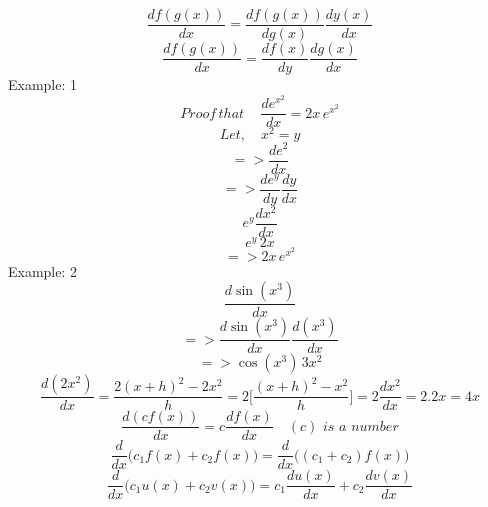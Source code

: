 	\begin{displaymath}
	\frac{df(g(x))}{dx} = \frac{df(g(x))}{dg(x)}\frac{dy(x)}{dx}
	\end{displaymath}
	\begin{equation}
	\frac{df(g(x))}{dx} = \frac{df(x)}{dy}\frac{dg(x)}{dx}
	\end{equation}
	\newline
	Example: 1
	\begin{equation}
	Proof\,that\, \quad\frac{de^{x^2}}{dx} = 2x \, e^{x^2}
	\end{equation}
	\begin{displaymath}
	Let, \quad x^2 = y
	\end{displaymath}
	\begin{displaymath}
	=> \frac{de^2}{dx}
	\end{displaymath}
	\begin{displaymath}
	=> \frac{de^y}{dy}\frac{dy}{dx}
	\end{displaymath}
	\begin{displaymath}
	e^y\frac{dx^2}{dx}
	\end{displaymath}
	\begin{displaymath}
	e^y\,2x
	\end{displaymath}
	\begin{displaymath}
	=> 2x\,e^{x^2}
	\end{displaymath}	
	\newline
	Example: 2
	\begin{displaymath}
	\frac{d\sin(x^3)}{dx}
	\end{displaymath}	 
	\begin{displaymath}
	=> \frac{d \sin(x^3)}{dx}\frac{d(x^3)}{dx}
	\end{displaymath}
	\begin{displaymath}
	=> \cos(x^3) \,3x^2
	\end{displaymath}
	\newline
	\begin{equation}
	\frac{d(2x^2)}{dx} = \frac{2(x+h)^2-2x^2}{h} = 2\Big[\frac{(x+h)^2-x^2}{h}\Big] = 2\frac{dx^2}{dx}=2.2x=4x
	\end{equation}
	\begin{equation}
	\frac{d(cf(x))}{dx} = c\frac{df(x)}{dx}\quad (c)\,\,is\,\,a\,\,number 
	\end{equation}
	\begin{equation}
	\frac{d}{dx}\bigg(c_1f(x)+c_2f(x)\bigg)=\frac{d}{dx}\bigg((c_1+c_2)f(x)\bigg)
	\end{equation}
	\begin{equation}
	\frac{d}{dx}\bigg(c_1u(x)+c_2v(x)\bigg)=c_1\frac{du(x)}{dx}+c_2\frac{dv(x)}{dx}
	\end{equation}
